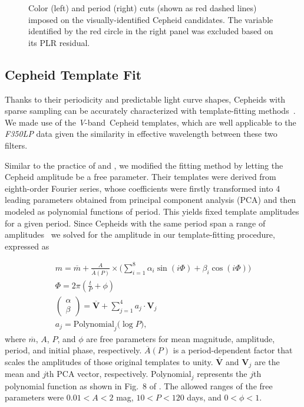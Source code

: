 \documentclass[twocolumn]{aastex63}
\newcommand{\hstw}{{\it F350LP} }
\newcommand{\V}{{\it V}-band}
\begin{document}
\begin{figure*}
\caption{Color (left) and period (right) cuts (shown as red dashed lines) imposed on the visually-identified Cepheid candidates. The variable identified by the red circle in the right panel was excluded based on its PLR residual.\label{fig_prc}}
\end{figure*}

\subsection{Cepheid Template Fit}

Thanks to their periodicity and predictable light curve shapes, Cepheids with sparse sampling can be accurately characterized with template-fitting methods~\citep[e.g.\ ][]{Stetson1996,2005MNRAS.363..749T}. We made use of the \citet{Yoachim2009} \V\ Cepheid templates, which are well applicable to the \hstw data given the similarity in effective wavelength between these two filters. 
\ \par
Similar to the practice of \citet{Shappee2011} and \citet{Hoffmann2016}, we modified the \citet{Yoachim2009} fitting method by letting the Cepheid amplitude be a free parameter. Their  templates were derived from eighth-order Fourier series, whose coefficients were firstly transformed into 4 leading parameters obtained from principal component analysis (PCA) and then modeled as polynomial functions of period. This yields fixed template amplitudes for a given period. Since Cepheids with the same period span a range of amplitudes~\citep{Stetson1996} we solved for the amplitude in our template-fitting procedure, expressed as

\begin{gather*}
  m  = \overline{m} + \frac{A}{\overline{A}(P)} \times \Big(\sum_{i=1}^8\alpha_i\sin (i\Phi) + \beta_i\cos (i\Phi) \Big)\\
  \Phi = 2\pi(\frac{t}{P}+\phi)\\
  \begin{pmatrix} \alpha \\ \beta \end{pmatrix} = \overline{\mathbf{V}} + \sum_{j=1}^4 a_j \cdot \mathbf{V}_j\\
  a_j = \mathrm{Polynomial}_j \big(\log P\big),
\end{gather*}
where $\overline{m}$, $A$, $P$, and $\phi$ are free parameters for mean magnitude, amplitude, period, and initial phase, respectively. $\overline{A}(P)$ is a period-dependent factor that scales the amplitudes of those original templates to unity. $\overline{\mathbf{V}}$ and $\mathbf{V}_j$ are the mean and $j$th PCA vector, respectively. Polynomial$_j$ represents the $j$th polynomial function as shown in Fig.~8 of \citet{Yoachim2009}. The allowed ranges of the free parameters were $0.01 < A < 2$ mag, $10 < P < 120$ days, and $0 < \phi < 1$.
\end{document}
